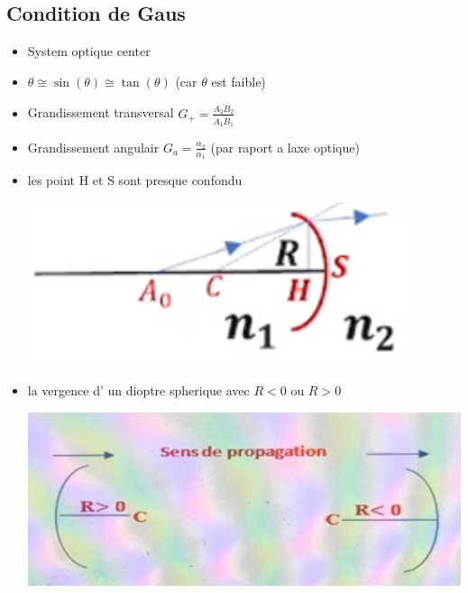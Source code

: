 \documentclass[12pt]{book}
\begin{document}
        \subsection{Condition de Gaus}
            \begin{itemize}
                \item  System optique center
                \item $\theta \cong \sin(\theta) \cong \tan(\theta)$ (car $\theta $ est faible)
                \item Grandissement transversal $G_+ = \frac{\overline{A_2B_2}}{\overline{A_1B_1}}$
                \item Grandissement angulair $G_a = \frac{\alpha_2}{\alpha_1}$ (par raport a laxe optique)\\
                    \begin{center}
                    \end{center}
                \item  les point H et S sont presque confondu \\ \begin{center}
                    \includegraphics[width = 0.2\linewidth]{pic/HetSconfoundu.png}
                \end{center}
                \item la vergence d' un dioptre spherique  avec $R < 0 $ ou $ R >0$ 
                \begin{center}
                    \includegraphics[width = 0.4\linewidth]{pic/Rposnega.png}
                \end{center}
            \end{itemize}
\end{document}

